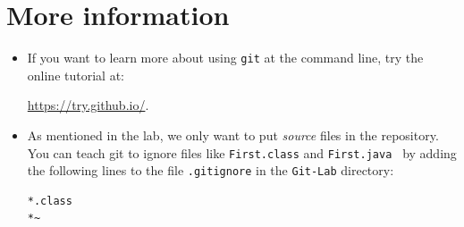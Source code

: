 \documentclass[11pt]{article}
\begin{document}
\section*{More information}

\begin{itemize}
\item If you want to learn more about using {\tt git} at the command line, try the online tutorial at:

\url{https://try.github.io/}.

\item As mentioned in the lab, we only want to put {\em source} files in the repository.  You can teach git to ignore files like {\tt First.class} and {\tt First.java~} by adding the following lines to the file {\tt .gitignore} in the {\tt Git-Lab} directory:

\begin{verbatim}
*.class
*~
\end{verbatim}

\end{itemize}
\end{document}
